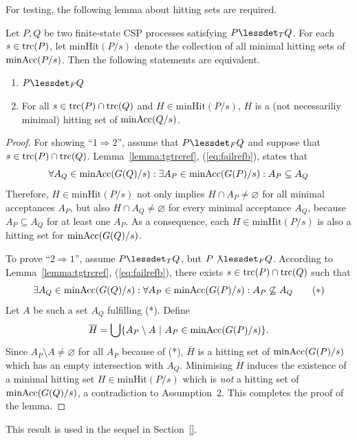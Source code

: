 For testing, the following lemma about hitting sets are required.

\begin{lemma}
\label{lemma:hseta}
Let $P, Q$ be two finite-state CSP processes satisfying $P\lessdet_T Q$.
For each $s\in\text{trc}(P)$,
let $\text{minHit}(P/s)$ denote the
collection of all minimal hitting sets of $\text{minAcc}(P/s)$.
Then the following statements are equivalent.
\begin{enumerate}
\item $P\lessdet_F Q$ 
\item For all $s\in\text{trc}(P)\cap \text{trc}(Q)$ and $H \in  \text{minHit}(P/s)$, $H$ is
a (not necessariliy minimal) hitting set of $\text{minAcc}(Q/s)$.
\end{enumerate}
\end{lemma}
\begin{proof}
For showing ``$1 \Rightarrow 2$'', assume that $P\lessdet_F Q$ and suppose
that $s\in\text{trc}(P)\cap \text{trc}(Q)$. Lemma~\ref{lemma:tgtrcref},
(\ref{eq:failrefb}), states that
\[
\forall A_Q\in\text{minAcc}(G(Q)/s):
\exists A_P\in\text{minAcc}(G(P)/s): A_P\subseteq A_Q
\]
Therefore, $H \in  \text{minHit}(P/s)$ not only implies $H\cap
A_P\neq\varnothing$ for all minimal acceptances $A_P$, but also $H\cap
A_Q\neq\varnothing$ for every minimal acceptance $A_Q$, because $A_P\subseteq
A_Q$ for at least one $A_P$. As a consequence, each $H \in
\text{minHit}(P/s)$ is also a hitting set for $\text{minAcc}(G(Q)/s)$.

To prove ``$2 \Rightarrow 1$'', assume $P\lessdet_T Q$, but $P\not\lessdet_F
Q$. According to Lemma~\ref{lemma:tgtrcref}, (\ref{eq:failrefb}), there
exists $s\in\text{trc}(P)\cap \text{trc}(Q)$ such that
\[
\exists A_Q\in\text{minAcc}(G(Q)/s): \forall A_P\in\text{minAcc}(G(P)/s): A_P\not\subseteq A_Q
\qquad (*)
\]
Let $A$ be such a set $A_Q$ fulfilling (*).
Define
\[
\overline H = \bigcup\{ A_P \setminus A~|~A_P\in\text{minAcc}(G(P)/s) \}.
\]
Since $A_P \setminus A \neq\varnothing$ for all $A_P$ because of (*),
$\overline H$ is a hitting set of $\text{minAcc}(G(P)/s)$ which has an  empty
intersection with $A_Q$. 
Minimising $\overline H$ induces the existence of a minimal hitting set $H\in
\text{minHit}(P/s)$ which is {\it not} a hitting set of $\text{minAcc}(G(Q)/s)$, a
contradiction to Assumption~2. This completes the proof of the lemma. \xbox
\end{proof}
%
This result is used in the sequel in Section~\ref{}.

%
%
